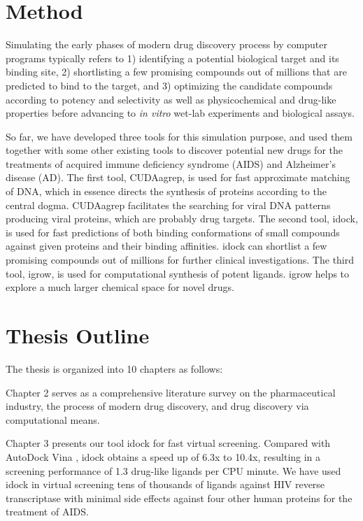 \section{Method}

Simulating the early phases of modern drug discovery process by computer programs typically refers to 1) identifying a potential biological target and its binding site, 2) shortlisting a few promising compounds out of millions that are predicted to bind to the target, and 3) optimizing the candidate compounds according to potency and selectivity as well as physicochemical and drug-like properties before advancing to \textit{in vitro} wet-lab experiments and biological assays.

So far, we have developed three tools for this simulation purpose, and used them together with some other existing tools to discover potential new drugs for the treatments of acquired immune deficiency syndrome (AIDS) and Alzheimer's disease (AD). The first tool, CUDAagrep, is used for fast approximate matching of DNA, which in essence directs the synthesis of proteins according to the central dogma. CUDAagrep facilitates the searching for viral DNA patterns producing viral proteins, which are probably drug targets. The second tool, idock, is used for fast predictions of both binding conformations of small compounds against given proteins and their binding affinities. idock can shortlist a few promising compounds out of millions for further clinical investigations. The third tool, igrow, is used for computational synthesis of potent ligands. igrow helps to explore a much larger chemical space for novel drugs.

\section{Thesis Outline}

The thesis is organized into 10 chapters as follows:

Chapter 2 serves as a comprehensive literature survey on the pharmaceutical industry, the process of modern drug discovery, and drug discovery via computational means.

Chapter 3 presents our tool idock for fast virtual screening. Compared with AutoDock Vina \citep{595}, idock obtains a speed up of 6.3x to 10.4x, resulting in a screening performance of 1.3 drug-like ligands per CPU minute. We have used idock in virtual screening tens of thousands of ligands against HIV reverse transcriptase with minimal side effects against four other human proteins for the treatment of AIDS.

